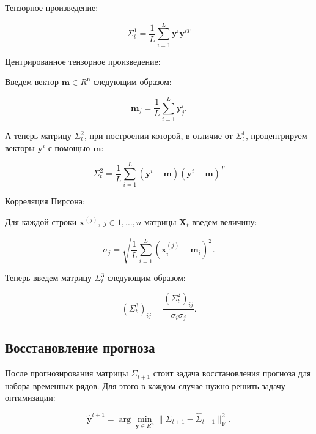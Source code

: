 \documentclass{article}
\begin{document}
Тензорное произведение:


\begin{equation}
\Sigma_t^{1} = \dfrac{1}{L}\sum\limits_{i = 1}^{L} \mathbf{y}^{i} \mathbf{y}^{iT}
\end{equation}

Центрированное тензорное произведение:

Введем вектор $\mathbf{m} \in R^{\text{n}}$ следующим образом:


\begin{equation}
\mathbf{m}_j = \dfrac1L \sum\limits_{i = 1}^{L} \mathbf{y}^{i}_j.
\end{equation}


А теперь матрицу $\Sigma_t^{2}$, при построении которой, в отличие от $\Sigma_t^{1}$, процентрируем векторы $\mathbf{y}^{i}$ с помощью  $\mathbf{m}$: 


\begin{equation}
\Sigma_t^{2} = \dfrac{1}{L}\sum\limits_{i = 1}^{L} (\mathbf{y}^{i} - \mathbf{m}) (\mathbf{y}^{i} - \mathbf{m})^T
\end{equation}

Корреляция Пирсона:

Для каждой строки $\mathbf{x}^{(j)}$, $j \in {1, \ldots, n}$ матрицы $\mathbf{X}_t$ введем величину:


\begin{equation}
\sigma_j = \sqrt{\dfrac{1}{L} \sum\limits_{i = 1}^L (\mathbf{x}^{(j)}_i - \mathbf{m}_i)^2}.
\end{equation}


Теперь введем матрицу $\Sigma_t^3$ следующим образом:


\begin{equation}
(\Sigma_t^{3})_{ij} = \dfrac{(\Sigma_t^{2})_{ij}}{\sigma_i \sigma_j}.
\end{equation}

\subsection{Восстановление прогноза}

После прогнозирования матрицы $\Sigma_{t + 1}$ стоит задача восстановления прогноза для набора временных рядов. Для этого в каждом случае нужно решить задачу оптимизации:

\begin{equation}
    \hat{\mathbf{y}}^{t + 1} = \arg \min \limits_{\mathbf{y} \in R^n}\|\Sigma_{t + 1} - \hat{\Sigma}_{t + 1}\|_{\text{F}}^2.
\end{equation}
\end{document}
